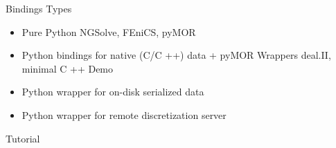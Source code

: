 \documentclass[%
  10pt,
  compress,
  table,
]{beamer}
\begin{document}
\begin{frame}{Bindings Types}
\begin{itemize}
\item Pure Python
NGSolve, FEniCS, pyMOR
\item Python bindings for native (C/C ++) data + pyMOR Wrappers
deal.II, minimal C ++ Demo
\item Python wrapper for on-disk serialized data
\item Python wrapper for remote discretization server
\end{itemize}
\end{frame}

\begin{frame}{Tutorial}

\end{frame}
\end{document}

